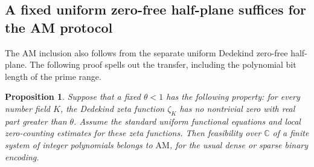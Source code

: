 \documentclass[11pt]{article}
\newtheorem{proposition}[theorem]{Proposition}
\theoremstyle{definition}
\theoremstyle{remark}
\begin{document}
\subsection{A fixed uniform zero-free half-plane suffices for the AM protocol}

The AM inclusion also follows from the separate uniform Dedekind
zero-free half-plane.  The following proof spells out the transfer,
including the polynomial bit length of the prime range.

\begin{proposition}\label{prop:fixed-strip-hn-am}
Suppose that a fixed $\theta<1$ has the following property:
for every number field $K$, the Dedekind zeta function $\zeta_K$
has no nontrivial zero with real part greater than $\theta$.
Assume the standard uniform functional equations and local
zero-counting estimates for these zeta functions.
Then feasibility over $\mathbb C$ of a finite system of integer
polynomials belongs to $\mathrm{AM}$, for the usual dense or
sparse binary encoding.
\end{proposition}
\end{document}
